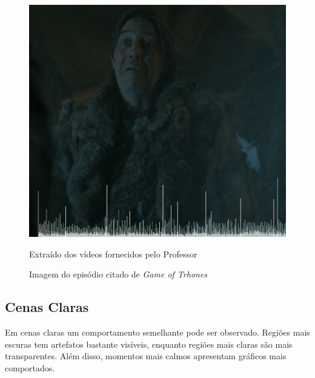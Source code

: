 \begin{figure}[H]
    \centering
    \caption{Imagem do episódio citado de \textit{Game of Trhones}}
    \label{fig:imagem18}
    
    \includegraphics[scale=0.35]{Documeto/1-ElementosTextuais/images/18.png}

    \small
    Extraído dos vídeos fornecidos pelo Professor
\end{figure}


\subsection{Cenas Claras}
Em cenas claras um comportamento semelhante pode ser observado. Regiões mais escuras tem artefatos bastante visíveis, enquanto regiões mais claras são mais transparentes. Além disso, momentos mais calmos apresentam gráficos mais comportados.

